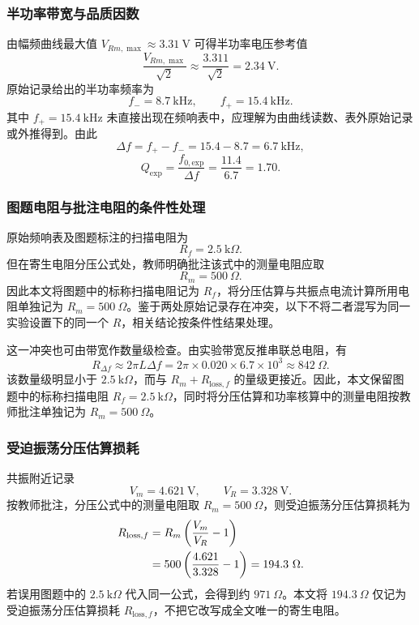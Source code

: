 ﻿\documentclass[UTF8,12pt,a4paper]{ctexart}
\numberwithin{equation}{section}
\begin{document}
\subsubsection{半功率带宽与品质因数}

由幅频曲线最大值 \(V_{Rm,\max}\approx3.31\ \mathrm{V}\) 可得半功率电压参考值
\begin{equation}
    \frac{V_{Rm,\max}}{\sqrt{2}}
    \approx \frac{3.311}{\sqrt{2}}
    =2.34\ \mathrm{V}.
\end{equation}
原始记录给出的半功率频率为
\[
    f_-=8.7\ \mathrm{kHz},\qquad
    f_+=15.4\ \mathrm{kHz}.
\]
其中 \(f_+=15.4\ \mathrm{kHz}\) 未直接出现在频响表中，应理解为由曲线读数、表外原始记录或外推得到。由此
\begin{equation}
    \Delta f=f_+-f_-
    =15.4-8.7
    =6.7\ \mathrm{kHz},
\end{equation}
\begin{equation}
    Q_{\mathrm{exp}}
    =\frac{f_{0,\mathrm{exp}}}{\Delta f}
    =\frac{11.4}{6.7}
    =1.70.
\end{equation}

\subsubsection{图题电阻与批注电阻的条件性处理}

原始频响表及图题标注的扫描电阻为
\[
    R_f=2.5\ \mathrm{k}\Omega.
\]
但在寄生电阻分压公式处，教师明确批注该式中的测量电阻应取
\[
    R_m=500\ \Omega.
\]
因此本文将图题中的标称扫描电阻记为 \(R_f\)，将分压估算与共振点电流计算所用电阻单独记为 \(R_m=500\ \Omega\)。鉴于两处原始记录存在冲突，以下不将二者混写为同一实验设置下的同一个 \(R\)，相关结论按条件性结果处理。

这一冲突也可由带宽作数量级检查。由实验带宽反推串联总电阻，有
\begin{equation}
    R_{\Delta f}\approx 2\pi L\Delta f
    =2\pi\times0.020\times6.7\times10^3
    \approx842\ \Omega.
\end{equation}
该数量级明显小于 \(2.5\ \mathrm{k}\Omega\)，而与 \(R_m+R_{\mathrm{loss},f}\) 的量级更接近。因此，本文保留图题中的标称扫描电阻 \(R_f=2.5\ \mathrm{k}\Omega\)，同时将分压估算和功率核算中的测量电阻按教师批注单独记为 \(R_m=500\ \Omega\)。

\subsubsection{受迫振荡分压估算损耗}

共振附近记录
\[
    V_m=4.621\ \mathrm{V},\qquad
    V_R=3.328\ \mathrm{V}.
\]
按教师批注，分压公式中的测量电阻取 \(R_m=500\ \Omega\)，则受迫振荡分压估算损耗为
\begin{align}
    R_{\mathrm{loss},f}
    &=R_m\left(\frac{V_m}{V_R}-1\right) \notag\\
    &=500\left(\frac{4.621}{3.328}-1\right)
      =194.3\ \Omega.
\end{align}
若误用图题中的 \(2.5\ \mathrm{k}\Omega\) 代入同一公式，会得到约 \(971\ \Omega\)。本文将 \(194.3\ \Omega\) 仅记为受迫振荡分压估算损耗 \(R_{\mathrm{loss},f}\)，不把它改写成全文唯一的寄生电阻。
\end{document}
